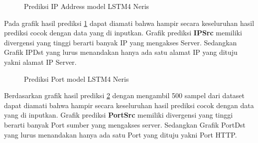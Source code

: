 \documentclass[./skripsi.tex]{subfiles}
\begin{document}
\begin{figure}
    \centering
    \caption{Prediksi IP Address model LSTM4 Neris}
    \label{fig:lstm4_neris_pred1}
\end{figure}

\par Pada grafik hasil prediksi \ref{fig:lstm4_neris_pred1} dapat diamati bahwa hampir secara keseluruhan hasil prediksi cocok dengan data yang di inputkan. Grafik prediksi \textbf{IPSrc} memiliki divergensi yang tinggi berarti banyak IP yang mengakses Server. Sedangkan Grafik IPDst yang lurus menandakan hanya ada satu alamat IP yang dituju yakni alamat IP Server.

\begin{figure}
    \centering
    \caption{Prediksi Port model LSTM4 Neris}
    \label{fig:lstm4_neris_pred2}
\end{figure}


\par Berdasarkan grafik hasil prediksi \ref{fig:lstm4_neris_pred2} dengan mengambil 500 sampel dari dataset dapat diamati bahwa hampir secara keseluruhan hasil prediksi cocok dengan data yang di inputkan. Grafik prediksi \textbf{PortSrc} memiliki divergensi yang tinggi berarti banyak Port sumber yang mengakses server. Sedangkan Grafik PortDst yang lurus menandakan hanya ada satu Port yang dituju yakni Port HTTP.
\end{document}
